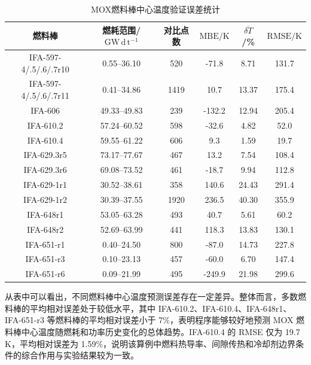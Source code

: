 \begin{table}[htbp]
	\centering
	\caption{MOX燃料棒中心温度验证误差统计}
	\label{tab:centerline_temperature_error}
	\begin{tabular*}{\textwidth}{@{\extracolsep{\fill}}cccccc@{}}
		\toprule
		燃料棒 & 燃耗范围/$\mathrm{GW\,d\,t^{-1}}$ & 对比点数 & $\mathrm{MBE}/\mathrm{K}$ & $\overline{\delta T}$/\% & $\mathrm{RMSE}/\mathrm{K}$ \\
		\midrule
		IFA-597-4/.5/.6/.7r10 & 0.55--36.10 & 520  & -71.8  & 8.71  & 131.7 \\
		IFA-597-4/.5/.6/.7r11 & 0.41--34.86 & 1419 & 10.7   & 13.37 & 175.4 \\
		IFA-606                & 49.33--49.83 & 239  & -132.2 & 12.94 & 205.4 \\
		IFA-610.2              & 57.24--60.52 & 598  & -32.6  & 4.82  & 52.0 \\
		IFA-610.4              & 59.55--61.22 & 606  & 9.3    & 1.59  & 19.7 \\
		IFA-629.3r5            & 73.17--77.67 & 467  & 13.2   & 7.54  & 108.4 \\
		IFA-629.3r6            & 69.08--73.52 & 461  & -18.7  & 9.94  & 112.8 \\
		IFA-629-1r1            & 30.52--38.61 & 358  & 140.6  & 24.43 & 291.4 \\
		IFA-629-1r2            & 30.39--37.55 & 1920 & 236.5  & 40.30 & 355.9 \\
		IFA-648r1              & 53.05--63.28 & 493  & 40.7   & 5.61  & 60.2 \\
		IFA-648r2              & 52.69--63.99 & 441  & 118.3  & 13.83 & 130.1 \\
		IFA-651-r1             & 0.40--24.50  & 800  & -87.0  & 14.73 & 227.8 \\
		IFA-651-r3             & 0.10--23.13  & 457  & -60.0  & 6.70  & 147.4 \\
		IFA-651-r6             & 0.09--21.99  & 495  & -249.9 & 21.98 & 299.6 \\
		\bottomrule
	\end{tabular*}
\end{table}

从表中可以看出，不同燃料棒中心温度预测误差存在一定差异。整体而言，多数燃料棒的平均相对误差处于较低水平，其中 IFA-610.2、IFA-610.4、IFA-648r1、IFA-651-r3 等燃料棒的平均相对误差小于 7\%，表明程序能够较好地预测 MOX 燃料棒中心温度随燃耗和功率历史变化的总体趋势。IFA-610.4 的 RMSE 仅为 19.7 K，平均相对误差为 1.59\%，说明该算例中燃料热导率、间隙传热和冷却剂边界条件的综合作用与实验结果较为一致。

